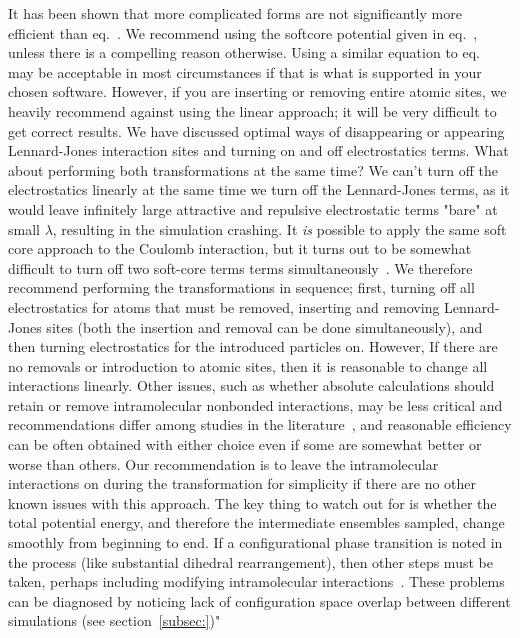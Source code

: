 \documentclass[9pt,bestpractices]{livecoms}
\begin{document}
It has been shown that more complicated forms are not significantly more efficient than eq.~\cite{pham2012optimal}.  We recommend using the softcore potential given in eq.~\cite{eq:softcore}, unless there is a compelling reason otherwise.  Using a similar equation to eq.~\cite{eq:softcore} may be acceptable in most circumstances if that is what is supported in your chosen software. However, if you are inserting or removing entire atomic sites, we heavily recommend against using the linear approach; it will be very difficult to get correct results. 
%
We have discussed optimal ways of disappearing or appearing Lennard-Jones interaction sites and turning on and off electrostatics terms.  What about performing both transformations at the same time? We can't turn off the electrostatics linearly at the same time we turn off the Lennard-Jones terms, as it would leave infinitely large attractive and repulsive electrostatic terms "bare" at small $\lambda$, resulting in the simulation crashing. It \textit{is} possible to apply the same soft core approach to the Coulomb interaction, but it turns out to be somewhat difficult to turn off two soft-core terms  terms simultaneously~\cite{Steinbrecher:JCC:2011}.  We therefore recommend performing the transformations in sequence; first, turning off all electrostatics for atoms that must be removed, inserting and removing Lennard-Jones sites (both the insertion and removal can be done simultaneously), and then turning electrostatics for the introduced particles on.  However, If there are no removals or introduction to atomic sites, then it is reasonable to change all interactions linearly.  
%
Other issues, such as whether absolute calculations should retain or remove intramolecular nonbonded interactions, may be less critical and recommendations differ among studies in the literature~\cite{}, and reasonable efficiency can be often obtained with either choice even if some are somewhat better or worse than others. Our recommendation is to leave the intramolecular interactions on during the transformation for simplicity if there are no other known issues with this approach.  The key thing to watch out for is whether the total potential energy, and therefore the intermediate ensembles sampled, change smoothly from beginning to end.  If a configurational phase transition is noted in the process (like substantial dihedral rearrangement), then other steps must be taken, perhaps including modifying intramolecular interactions~\cite{???}.  These problems can be diagnosed by noticing lack of configuration space overlap between different simulations (see section~\ref{subsec:})" 
\end{document}
